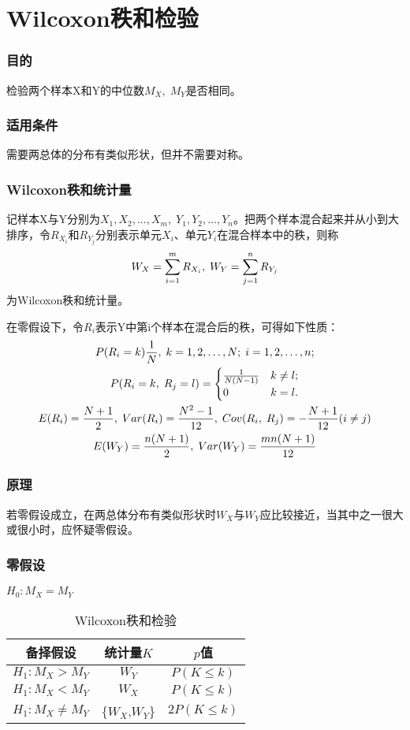 \section{Wilcoxon秩和检验}

\subsubsection{目的}
检验两个样本X和Y的中位数$M_X,\;M_Y$是否相同。
\subsubsection{适用条件}
需要两总体的分布有类似形状，但并不需要对称。
\subsubsection{Wilcoxon秩和统计量}
记样本X与Y分别为$X_1,X_2,\dots,X_m,\;Y_1,Y_2,\dots,Y_n$。把两个样本混合起来并从小到大排序，令$R_{X_i}$和$R_{Y_j}$分别表示单元$X_i$、单元$Y_i$在混合样本中的秩，则称
\begin{equation}
	W_X=\sum_{i=1}^mR_{X_i},\;W_Y=\sum_{j=1}^nR_{Y_j}\notag
\end{equation}
为Wilcoxon秩和统计量。\par
在零假设下，令$R_i$表示Y中第i个样本在混合后的秩，可得如下性质：
\begin{gather}
	P(R_i=k)\frac{1}{N},\;k=1,2,\dots,N;\;i=1,2,\dots,n;\notag\\
	P(R_i=k,\;R_j=l)=
	\begin{cases}
		\frac{1}{N(N-1)} & k\ne l;\\
		0                & k=l.
	\end{cases}\notag\\
	E(R_i)=\frac{N+1}{2},\;Var(R_i)=\frac{N^2-1}{12},\;Cov(R_i,\;R_j)=-\frac{N+1}{12}(i\ne j)\notag\\
	E(W_Y)=\frac{n(N+1)}{2},\;Var(W_Y)=\frac{mn(N+1)}{12}\notag
\end{gather}
\subsubsection{原理}
若零假设成立，在两总体分布有类似形状时$W_X$与$W_Y$应比较接近，当其中之一很大或很小时，应怀疑零假设。
\subsubsection{零假设}
$H_0:M_X=M_Y$

\begin{table}[htbp]
	\centering
	\begin{tabular}{ccc}
		\toprule
		备择假设 & 统计量$K$ & $p$值 \\
		\midrule 
		$H_1:M_X>M_Y$ & $W_Y$ & $P(K\leqslant k)$ \\
		$H_1:M_X<M_Y$ & $W_X$ & $P(K\leqslant k)$ \\
		$H_1:M_X\ne M_Y$ & \text{min}\{$W_X$,\;$W_Y$\} & $2P(K\leqslant k)$ \\
		\bottomrule 
	\end{tabular}
	\caption{Wilcoxon秩和检验}
\end{table}

